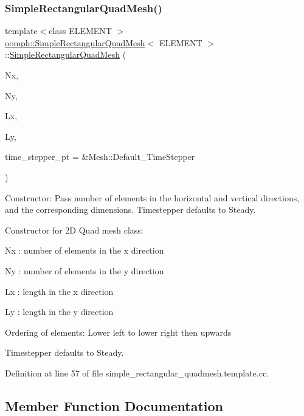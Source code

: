 \subsubsection{\texorpdfstring{Simple\+Rectangular\+Quad\+Mesh()}{SimpleRectangularQuadMesh()}}
{\footnotesize\ttfamily template$<$class E\+L\+E\+M\+E\+NT $>$ \\
\hyperlink{classoomph_1_1SimpleRectangularQuadMesh}{oomph\+::\+Simple\+Rectangular\+Quad\+Mesh}$<$ E\+L\+E\+M\+E\+NT $>$\+::\hyperlink{classoomph_1_1SimpleRectangularQuadMesh}{Simple\+Rectangular\+Quad\+Mesh} (\begin{DoxyParamCaption}\item[{const unsigned \&}]{Nx,  }\item[{const unsigned \&}]{Ny,  }\item[{const double \&}]{Lx,  }\item[{const double \&}]{Ly,  }\item[{Time\+Stepper $\ast$}]{time\+\_\+stepper\+\_\+pt = {\ttfamily \&Mesh\+:\+:Default\+\_\+TimeStepper} }\end{DoxyParamCaption})}



Constructor\+: Pass number of elements in the horizontal and vertical directions, and the corresponding dimensions. Timestepper defaults to Steady. 

Constructor for 2D Quad mesh class\+:

Nx \+: number of elements in the x direction

Ny \+: number of elements in the y direction

Lx \+: length in the x direction

Ly \+: length in the y direction

Ordering of elements\+: \textquotesingle{}Lower left\textquotesingle{} to \textquotesingle{}lower right\textquotesingle{} then \textquotesingle{}upwards\textquotesingle{}

Timestepper defaults to Steady. 

Definition at line 57 of file simple\+\_\+rectangular\+\_\+quadmesh.\+template.\+cc.



\subsection{Member Function Documentation}
\mbox{\label{classoomph_1_1SimpleRectangularQuadMesh_a4ff7678ec433180e2245ea2147f222b7}} 
